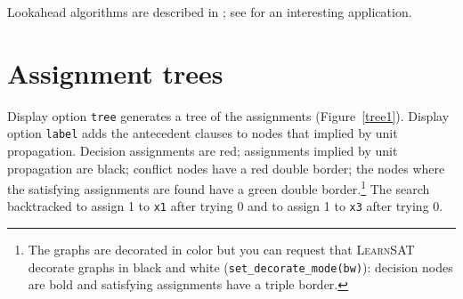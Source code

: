 \documentclass[11pt]{report}
\newcommand*{\p}[1]{\textup{\texttt{#1}}}
\newcommand*{\ls}{\textsc{LearnSAT}}
\begin{document}
Lookahead algorithms are described in \cite{look}; see \cite{brute} for an interesting application.


\section{Assignment trees}

Display option \p{tree} generates a tree of the assignments (Figure~\ref{tree1}). Display option \p{label} adds the antecedent clauses to nodes that implied by unit propagation. Decision assignments are red; assignments implied by unit propagation are black; conflict nodes have a red double border; the nodes where the satisfying assignments are found have a green double border.\footnote{The graphs are decorated in color but you can request that \ls{} decorate graphs in black and white (\p{set\_decorate\_mode(bw)}): decision nodes are bold and satisfying assignments have a triple border.} The search backtracked to assign 1 to \p{x1} after trying 0 and to assign 1 to \p{x3} after trying 0.
\end{document}
